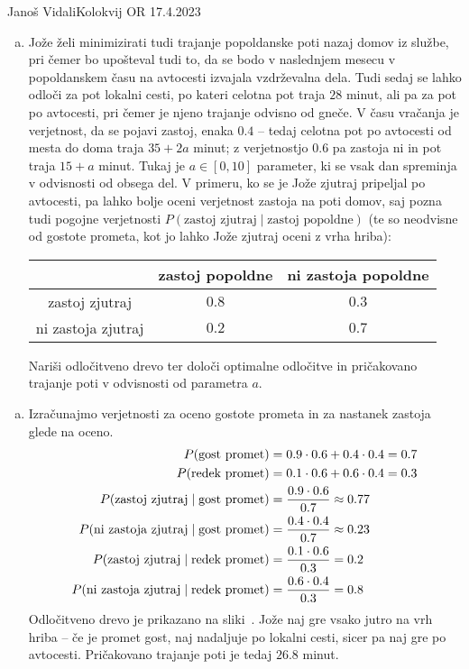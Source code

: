 \begin{naloga}{Janoš Vidali}{Kolokvij OR 17.4.2023}
\begin{vprasanje}
\begin{enumerate}[(a)]
\item Jože želi minimizirati tudi trajanje popoldanske poti nazaj domov iz službe,
pri čemer bo upošteval tudi to,
da se bodo v naslednjem mesecu v popoldanskem času
na avtocesti izvajala vzdrževalna dela.
Tudi sedaj se lahko odloči za pot lokalni cesti,
po kateri celotna pot traja $28$ minut,
ali pa za pot po avtocesti, pri čemer je njeno trajanje odvisno od gneče.
V času vračanja je verjetnost, da se pojavi zastoj, enaka $0.4$
-- tedaj celotna pot po avtocesti od mesta do doma traja $35 + 2a$ minut;
z verjetnostjo $0.6$ pa zastoja ni in pot traja $15 + a$ minut.
Tukaj je $a \in [0, 10]$ parameter,
ki se vsak dan spreminja v odvisnosti od obsega del.
V primeru, ko se je Jože zjutraj pripeljal po avtocesti,
pa lahko bolje oceni verjetnost zastoja na poti domov,
saj pozna tudi pogojne verjetnosti
$P(\text{zastoj zjutraj} \mid \text{zastoj popoldne})$
(te so neodvisne od gostote prometa,
kot jo lahko Jože zjutraj oceni z vrha hriba):
\begin{center}
\begin{tabular}{c|cc}
& zastoj popoldne & ni zastoja popoldne \\
\hline
zastoj zjutraj & $0.8$ & $0.3$ \\
ni zastoja zjutraj & $0.2$ & $0.7$
\end{tabular}
\end{center}
Nariši odločitveno drevo
ter določi optimalne odločitve in pričakovano trajanje poti
v odvisnosti od parametra $a$.
\end{enumerate}
\end{vprasanje}

\begin{odgovor}
\begin{enumerate}[(a)]
\item Izračunajmo verjetnosti za oceno gostote prometa
in za nastanek zastoja glede na oceno.
\begin{align*}
P(\text{gost promet}) &= 0.9 \cdot 0.6 + 0.4 \cdot 0.4 = 0.7 \\
P(\text{redek promet}) &= 0.1 \cdot 0.6 + 0.6 \cdot 0.4 = 0.3 \\
P(\text{zastoj zjutraj} \mid \text{gost promet})
&= {0.9 \cdot 0.6 \over 0.7} \approx 0.77 \\
P(\text{ni zastoja zjutraj} \mid \text{gost promet})
&= {0.4 \cdot 0.4 \over 0.7} \approx 0.23 \\
P(\text{zastoj zjutraj} \mid \text{redek promet})
&= {0.1 \cdot 0.6 \over 0.3} = 0.2 \\
P(\text{ni zastoja zjutraj} \mid \text{redek promet})
&= {0.6 \cdot 0.4 \over 0.3} = 0.8
\end{align*}
Odločitveno drevo je prikazano na sliki~\fig[zastoj-a].
Jože naj gre vsako jutro na vrh hriba
-- če je promet gost, naj nadaljuje po lokalni cesti,
sicer pa naj gre po avtocesti.
Pričakovano trajanje poti je tedaj $26.8$ minut.


\end{enumerate}
\end{odgovor}
\end{naloga}
